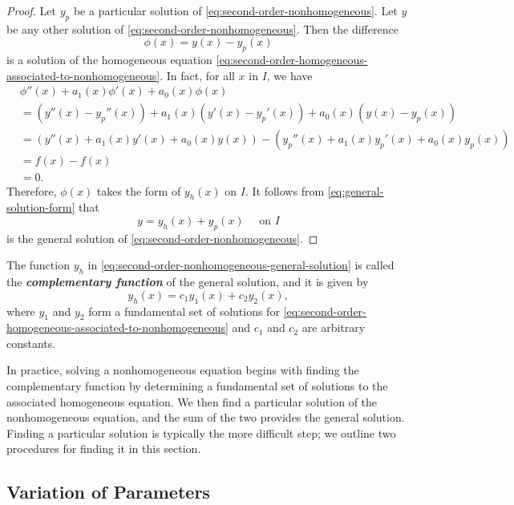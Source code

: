 \begin{proof}  Let $y_p$ be a particular solution of \eqref{eq:second-order-nonhomogeneous}. Let $y$ be any other solution of \eqref{eq:second-order-nonhomogeneous}. Then the difference
\begin{equation}\label{eq:general-solution-form}
		\phi(x)=y(x) -y_p(x)
\end{equation}
is a solution of the homogeneous equation \eqref{eq:second-order-homogeneous-associated-to-nonhomogeneous}. In fact, for all $x$ in $I$, we have
\[
\begin{split}
		&\phi''(x) + a_1(x)\phi'(x) + a_0(x)\phi(x)\\
		 &= \left(y''(x) -y_p''(x)\right)+a_1(x)\left(y'(x) -y_p'(x)\right)+a_0(x)\left(y(x) -y_p(x)\right)\\
		&= \left(y''(x) + a_1(x)y'(x) + a_0(x)y(x)\right)- \left(y_p''(x) + a_1(x)y_p'(x) + a_0(x)y_p(x)\right)\\
		&=f(x)-f(x)\\
		&=0. 
\end{split}
\] 
Therefore, $\phi(x)$ takes the form of $y_h(x)$ on $I.$ It follows from \eqref{eq:general-solution-form}  that \[y= y_h(x) + y_p(x)\quad \mbox{ on } I \] is the general solution of \eqref{eq:second-order-nonhomogeneous}.
\end{proof}

	\begin{remark}
		The function $y_h$ in \eqref{eq:second-order-nonhomogeneous-general-solution} is called the \textbf{\textit{complementary function}} of the general solution, and it is given by
	\[y_h(x)=c_1 y_1(x) + c_2 y_2(x),\] where $y_1$ and  $y_2$ form a fundamental set of solutions for  \eqref{eq:second-order-homogeneous-associated-to-nonhomogeneous} and $c_1$ and $c_2$ are arbitrary constants. 
\end{remark}

In practice, solving a nonhomogeneous equation begins with finding the complementary function by determining a fundamental set of solutions to the associated homogeneous equation. We then find a particular solution of the nonhomogeneous equation, and the sum of the two provides the general solution. Finding a particular solution is typically the more difficult step; we outline two procedures for finding it  in this section.

\subsection{Variation of Parameters}\label{subsec:variation-parameters}

